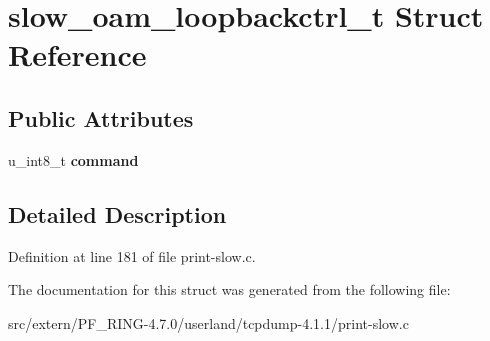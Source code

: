 \hypertarget{structslow__oam__loopbackctrl__t}{
\section{slow\_\-oam\_\-loopbackctrl\_\-t Struct Reference}
\label{structslow__oam__loopbackctrl__t}
}
\subsection*{Public Attributes}
\begin{DoxyCompactItemize}
\item 
\hypertarget{structslow__oam__loopbackctrl__t_a50c06ba00a04d176b116b0d57206d315}{
u\_\-int8\_\-t {\bfseries command}}
\label{structslow__oam__loopbackctrl__t_a50c06ba00a04d176b116b0d57206d315}

\end{DoxyCompactItemize}


\subsection{Detailed Description}


Definition at line 181 of file print-\/slow.c.



The documentation for this struct was generated from the following file:\begin{DoxyCompactItemize}
\item 
src/extern/PF\_\-RING-\/4.7.0/userland/tcpdump-\/4.1.1/print-\/slow.c\end{DoxyCompactItemize}
